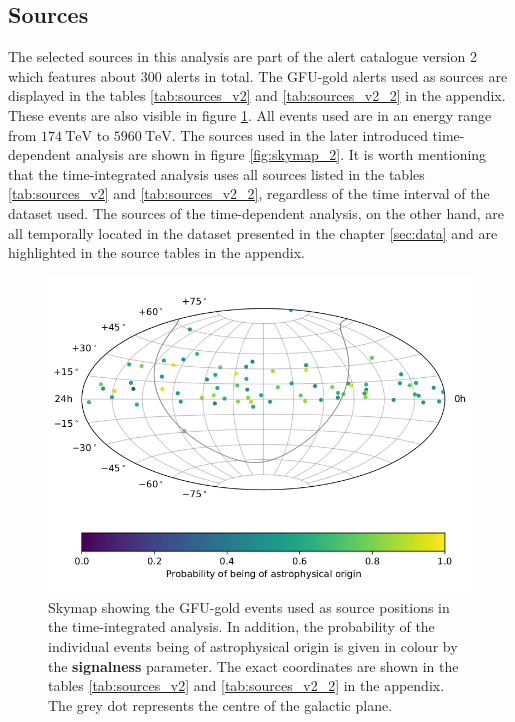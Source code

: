 \subsection{Sources}

The selected sources in this analysis are part of the alert catalogue version 2 which features about $\num{300}$ alerts in total.
The GFU-gold alerts used as sources are displayed in the tables \ref{tab:sources_v2} and \ref{tab:sources_v2_2} in the appendix.
These events are also visible in figure \ref{fig:skymap_1}.
All events used are in an energy range from $\SI{174}{\tera\electronvolt}$ to $\SI{5960}{\tera\electronvolt}$.
The sources used in the later introduced time-dependent analysis are shown in figure \ref{fig:skymap_2}.
It is worth mentioning that the time-integrated analysis uses all sources listed in the tables \ref{tab:sources_v2} and \ref{tab:sources_v2_2}, regardless of the time interval of the dataset used.
The sources of the time-dependent analysis, on the other hand, are all temporally located in the dataset presented in the chapter \ref{sec:data} and are highlighted in the source tables in the appendix.

\begin{figure}
    \centering
    \includegraphics[draft=false,width=\linewidth]{Plots/02_sources/gfu_gold_skymap.png} %
    \caption{Skymap showing the GFU-gold events used as source positions in the time-integrated analysis. In addition, the probability of the individual events being of astrophysical origin is given in colour by the \textbf{signalness} parameter. The exact coordinates are shown in the tables \ref{tab:sources_v2} and \ref{tab:sources_v2_2} in the appendix. The grey dot represents the centre of the galactic plane.}
    \label{fig:skymap_1}
\end{figure}

